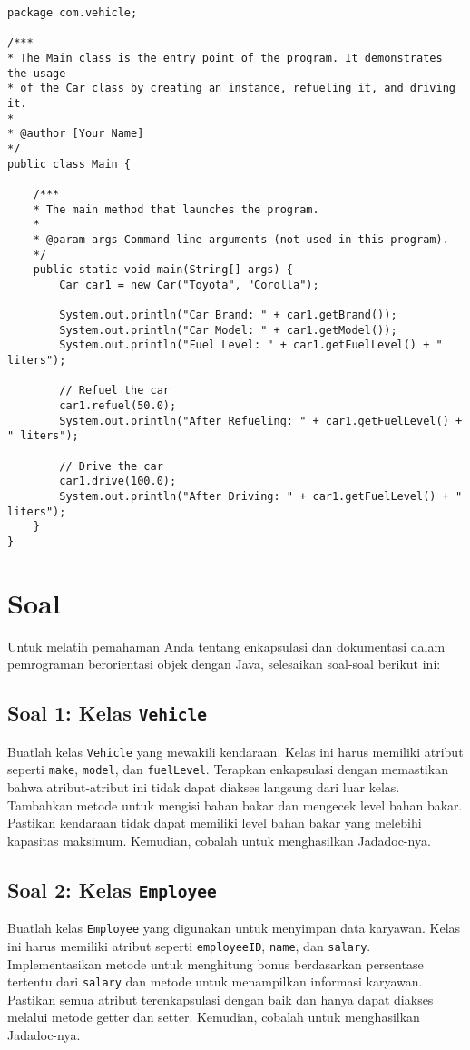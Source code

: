 \begin{lstlisting}[style=JavaStyle, caption={Kode Java: Main.java}]
package com.vehicle;

/***
* The Main class is the entry point of the program. It demonstrates the usage
* of the Car class by creating an instance, refueling it, and driving it.
* 
* @author [Your Name]
*/
public class Main {
	
	/***
	* The main method that launches the program.
	* 
	* @param args Command-line arguments (not used in this program).
	*/
	public static void main(String[] args) {
		Car car1 = new Car("Toyota", "Corolla");
		
		System.out.println("Car Brand: " + car1.getBrand());
		System.out.println("Car Model: " + car1.getModel());
		System.out.println("Fuel Level: " + car1.getFuelLevel() + " liters");
		
		// Refuel the car
		car1.refuel(50.0);
		System.out.println("After Refueling: " + car1.getFuelLevel() + " liters");
		
		// Drive the car
		car1.drive(100.0);
		System.out.println("After Driving: " + car1.getFuelLevel() + " liters");
	}
}
\end{lstlisting}


\section{Soal}

Untuk melatih pemahaman Anda tentang enkapsulasi dan dokumentasi dalam pemrograman berorientasi objek dengan Java, selesaikan soal-soal berikut ini:

\subsection{Soal 1: Kelas \texttt{Vehicle}}

Buatlah kelas \texttt{Vehicle} yang mewakili kendaraan. Kelas ini harus memiliki atribut seperti \texttt{make}, \texttt{model}, dan \texttt{fuelLevel}. Terapkan enkapsulasi dengan memastikan bahwa atribut-atribut ini tidak dapat diakses langsung dari luar kelas. Tambahkan metode untuk mengisi bahan bakar dan mengecek level bahan bakar. Pastikan kendaraan tidak dapat memiliki level bahan bakar yang melebihi kapasitas maksimum. Kemudian, cobalah untuk menghasilkan Jadadoc-nya.

\subsection{Soal 2: Kelas \texttt{Employee}}

Buatlah kelas \texttt{Employee} yang digunakan untuk menyimpan data karyawan. Kelas ini harus memiliki atribut seperti \texttt{employeeID}, \texttt{name}, dan \texttt{salary}. Implementasikan metode untuk menghitung bonus berdasarkan persentase tertentu dari \texttt{salary} dan metode untuk menampilkan informasi karyawan. Pastikan semua atribut terenkapsulasi dengan baik dan hanya dapat diakses melalui metode getter dan setter. Kemudian, cobalah untuk menghasilkan Jadadoc-nya.


